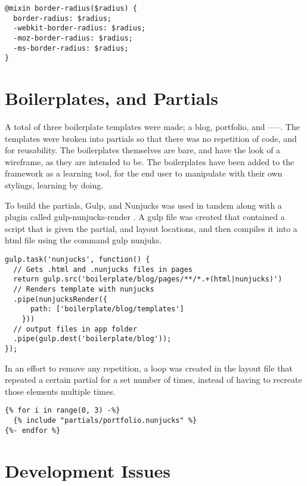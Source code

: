 \begin{lstlisting}[language=CSS3]
@mixin border-radius($radius) {
  border-radius: $radius;
  -webkit-border-radius: $radius;
  -moz-border-radius: $radius;
  -ms-border-radius: $radius;
}
\end{lstlisting}

\newpage
{}
\section*{Boilerplates, and Partials}

A total of three boilerplate templates were made; a blog, portfolio, and -----. The templates were broken into partials so that there was no repetition of code, and for reusability. The boilerplates themselves are bare, and have the look of a wireframe, as they are intended to be. The boilerplates have been added to the framework as a learning tool, for the end user to manipulate with their own stylings, learning by doing. 

To build the partials, Gulp, and Nunjucks was used in tandem along with a plugin called gulp-nunjucks-render \citep{PLUG17} . A gulp file was created that contained a script that is given the partial, and layout locations, and then compiles it into a html file using the command gulp nunjuks.

\begin{lstlisting}[language=CSS3]
gulp.task('nunjucks', function() {
  // Gets .html and .nunjucks files in pages
  return gulp.src('boilerplate/blog/pages/**/*.+(html|nunjucks)')
  // Renders template with nunjucks
  .pipe(nunjucksRender({
      path: ['boilerplate/blog/templates']
    }))
  // output files in app folder
  .pipe(gulp.dest('boilerplate/blog'));
});

\end{lstlisting}


In an effort to remove any repetition, a loop was created in the layout file that repeated a certain partial for a set number of times, instead of having to recreate those elements multiple times. 

\begin{lstlisting}[language=CSS3]
{% for i in range(0, 3) -%}
  {% include "partials/portfolio.nunjucks" %}
{%- endfor %}
\end{lstlisting}


\newpage
\section*{Development Issues}

